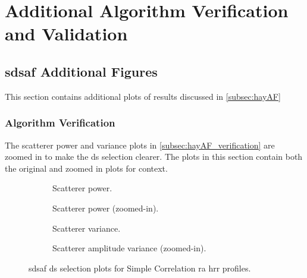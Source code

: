 \documentclass[class=report,11pt,crop=false]{standalone}
\begin{document}
\appendix
\chapter{Additional Algorithm Verification and Validation \label{apndxA}}
\section{\gls{sdsaf} Additional Figures}
This section contains additional plots of results discussed in \autoref{subsec:hayAF}
    \subsection{Algorithm Verification}
    The scatterer power and variance plots in \autoref{subsec:hayAF_verification} are zoomed in to make the \gls{ds} selection clearer. The plots in this section contain both the original and zoomed in plots for context. 

    \begin{figure}
        \centering
        \begin{subfigure}{0.4\linewidth}
                \centering
                \resizebox{\linewidth}{!}{}
                \caption{Scatterer power.\label{subfig:apndxA_hayAF_SCRA_sim_power}}
        \end{subfigure}
         \hspace{1cm}
        \begin{subfigure}{0.4\linewidth}
                \centering
                \resizebox{\linewidth}{!}{}
                \caption{Scatterer power (zoomed-in).\label{subfig:apndxA_hayAF_SCRA_sim_power_zoomed}}
        \end{subfigure}
        \begin{subfigure}{0.4\linewidth}
                \centering
                \resizebox{\linewidth}{!}{}
                \caption{Scatterer variance.\label{subfig:apndxA_hayAF_SCRA_sim_var}}
        \end{subfigure}
        \hspace{1cm}
        \begin{subfigure}{0.4\linewidth}
                \centering
                \resizebox{\linewidth}{!}{}
                \caption{Scatterer amplitude variance (zoomed-in). \label{subfig:apndxA_hayAF_SCRA_sim_var_zoomed}}
        \end{subfigure}
        \caption{\gls{sdsaf} \gls{ds} selection plots for Simple Correlation \gls{ra} \gls{hrr} profiles.\label{fig:apndxA_hayAF_SCRA_sim}}
    \end{figure}
\end{document}
